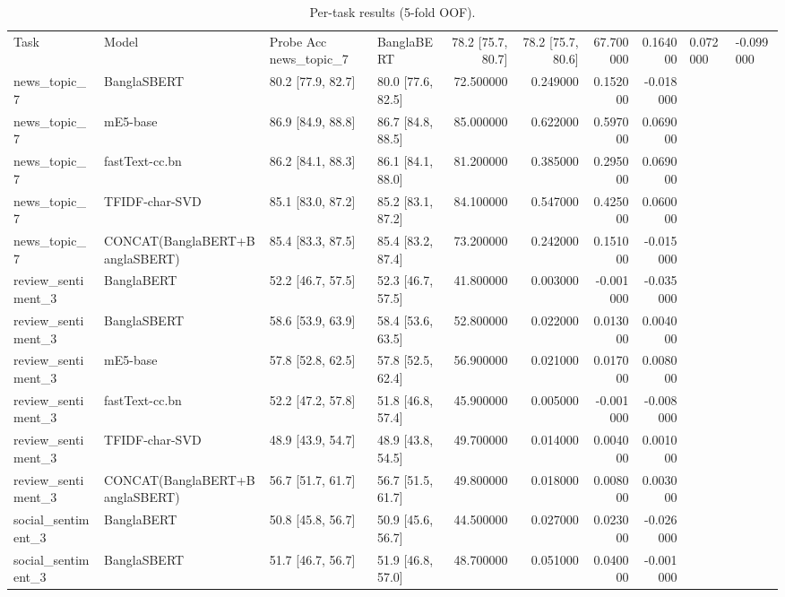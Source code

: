 \begin{table}
\caption{Per-task results (5-fold OOF).}
\label{tab:main}
\begin{tabular}{llllrrrr}
\toprule
Task & Model & Probe Acc %
\midrule
news_topic_7 & BanglaBERT & 78.2 [75.7, 80.7] & 78.2 [75.7, 80.6] & 67.700000 & 0.164000 & 0.072000 & -0.099000 \\
news_topic_7 & BanglaSBERT & 80.2 [77.9, 82.7] & 80.0 [77.6, 82.5] & 72.500000 & 0.249000 & 0.152000 & -0.018000 \\
news_topic_7 & mE5-base & 86.9 [84.9, 88.8] & 86.7 [84.8, 88.5] & 85.000000 & 0.622000 & 0.597000 & 0.069000 \\
news_topic_7 & fastText-cc.bn & 86.2 [84.1, 88.3] & 86.1 [84.1, 88.0] & 81.200000 & 0.385000 & 0.295000 & 0.069000 \\
news_topic_7 & TFIDF-char-SVD & 85.1 [83.0, 87.2] & 85.2 [83.1, 87.2] & 84.100000 & 0.547000 & 0.425000 & 0.060000 \\
news_topic_7 & CONCAT(BanglaBERT+BanglaSBERT) & 85.4 [83.3, 87.5] & 85.4 [83.2, 87.4] & 73.200000 & 0.242000 & 0.151000 & -0.015000 \\
review_sentiment_3 & BanglaBERT & 52.2 [46.7, 57.5] & 52.3 [46.7, 57.5] & 41.800000 & 0.003000 & -0.001000 & -0.035000 \\
review_sentiment_3 & BanglaSBERT & 58.6 [53.9, 63.9] & 58.4 [53.6, 63.5] & 52.800000 & 0.022000 & 0.013000 & 0.004000 \\
review_sentiment_3 & mE5-base & 57.8 [52.8, 62.5] & 57.8 [52.5, 62.4] & 56.900000 & 0.021000 & 0.017000 & 0.008000 \\
review_sentiment_3 & fastText-cc.bn & 52.2 [47.2, 57.8] & 51.8 [46.8, 57.4] & 45.900000 & 0.005000 & -0.001000 & -0.008000 \\
review_sentiment_3 & TFIDF-char-SVD & 48.9 [43.9, 54.7] & 48.9 [43.8, 54.5] & 49.700000 & 0.014000 & 0.004000 & 0.001000 \\
review_sentiment_3 & CONCAT(BanglaBERT+BanglaSBERT) & 56.7 [51.7, 61.7] & 56.7 [51.5, 61.7] & 49.800000 & 0.018000 & 0.008000 & 0.003000 \\
social_sentiment_3 & BanglaBERT & 50.8 [45.8, 56.7] & 50.9 [45.6, 56.7] & 44.500000 & 0.027000 & 0.023000 & -0.026000 \\
social_sentiment_3 & BanglaSBERT & 51.7 [46.7, 56.7] & 51.9 [46.8, 57.0] & 48.700000 & 0.051000 & 0.040000 & -0.001000 \\

\end{tabular}
\end{table}
